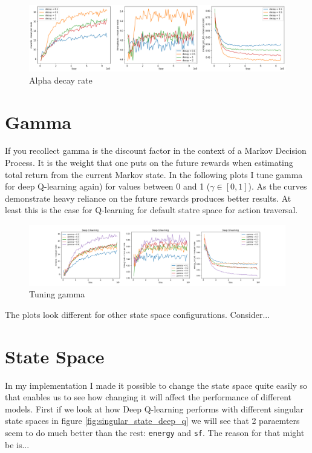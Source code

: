 \begin{figure}[H]
\centering
\hspace*{-1.1cm}  
\includegraphics[scale=0.40]{plots/decays/alpha_deep_q_SMALL.png}
  \caption{Alpha decay rate}
\end{figure}

\section{Gamma}
If you recollect gamma is the discount factor in the 
context of a Markov Decision Process. It is the weight 
that one puts on the future rewards when estimating total
return from the current Markov state. In the following 
plots I tune gamma for deep Q-learning again) for values
between 0 and 1 ($\gamma \in [0,1]$). As the curves demonstrate heavy reliance on the future rewards produces better results. At least this is the case for Q-learning 
for default statre space for action traversal. 



\begin{figure}[H]
\centering
\hspace*{-3.3cm}  
\includegraphics[scale=0.40]{plots/gamma/gamma_deep_q_SMALL.png}
  \caption{Tuning gamma}
\end{figure}

The plots look different for other state space configurations.
Consider...

\section{State Space}

In my implementation I made it possible to change the 
state space quite easily so that enables us to see
how changing it will affect the performance of different 
models. First if we look at how Deep Q-learning performs
with different singular state spaces in figure \ref{fig:singular_state_deep_q} we will see that 2 paraemters
seem to do much better than the rest: \texttt{energy} and
\texttt{sf}. The reason for that might be is...\\

